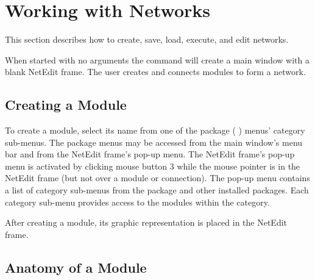 %
%
%
%
%

%

\section{Working with Networks}
\label{sec:workwithnets}

This section describes how to create, save, load, execute, and edit
networks.

When started with no arguments the  command will create a
main window with a blank NetEdit frame. The user creates and
connects modules to form a network.


\subsection{Creating a Module}
\label{sec:creatingmodules}

To create a module, select its name from one of the package (\eg{} \sr)
menus' category sub-menus.  The package menus may be accessed from the
main window's menu bar and from the NetEdit frame's pop-up menu. 
 The NetEdit frame's pop-up menu is activated by clicking mouse button
3 while the mouse pointer is in the NetEdit frame (but not over a
module or connection).  The pop-up menu contains a list of category
sub-menus from the \sr{} package and other installed packages. 
Each category sub-menu provides access to the modules within the
category.

After creating a module, its graphic representation is 
placed in the NetEdit frame.

\subsection{Anatomy of a Module}
\label{sec:modanatomy}

  \newcommand{\modgraphic}%
  {\centerline{\epsfig{file=Figures/modgraphic-1.eps.gz,width=4in,
        bbllx=0, bblly=0, bburx=325, bbury=157}}}
\begin{htmlonly}
  \newcommand{\modgraphic}{%
  \htmladdimg[align=top,width="256",alt="SCIRun Module Graphic"]
  {../Figures/modgraphic-1.gif}}
\end{htmlonly}

